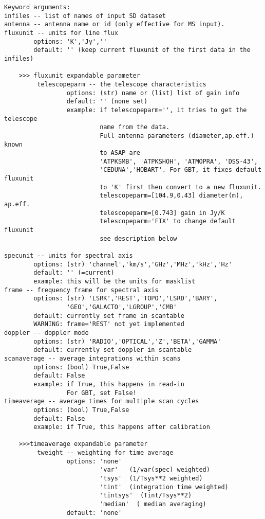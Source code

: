 \begin{verbatim}
Keyword arguments:
infiles -- list of names of input SD dataset
antenna -- antenna name or id (only effective for MS input). 
fluxunit -- units for line flux
        options: 'K','Jy',''
        default: '' (keep current fluxunit of the first data in the infiles)

    >>> fluxunit expandable parameter
         telescopeparm -- the telescope characteristics
                 options: (str) name or (list) list of gain info
                 default: '' (none set)
                 example: if telescopeparm='', it tries to get the telescope
                          name from the data.
                          Full antenna parameters (diameter,ap.eff.) known
                          to ASAP are
                          'ATPKSMB', 'ATPKSHOH', 'ATMOPRA', 'DSS-43',
                          'CEDUNA','HOBART'. For GBT, it fixes default fluxunit
                          to 'K' first then convert to a new fluxunit.
                          telescopeparm=[104.9,0.43] diameter(m), ap.eff.
                          telescopeparm=[0.743] gain in Jy/K
                          telescopeparm='FIX' to change default fluxunit
                          see description below

specunit -- units for spectral axis
        options: (str) 'channel','km/s','GHz','MHz','kHz','Hz'
        default: '' (=current)
        example: this will be the units for masklist
frame -- frequency frame for spectral axis
        options: (str) 'LSRK','REST','TOPO','LSRD','BARY',
                 'GEO','GALACTO','LGROUP','CMB'
        default: currently set frame in scantable
        WARNING: frame='REST' not yet implemented
doppler -- doppler mode
        options: (str) 'RADIO','OPTICAL','Z','BETA','GAMMA'
        default: currently set doppler in scantable
scanaverage -- average integrations within scans
        options: (bool) True,False
        default: False
        example: if True, this happens in read-in
                 For GBT, set False!
timeaverage -- average times for multiple scan cycles
        options: (bool) True,False
        default: False
        example: if True, this happens after calibration

    >>>timeaverage expandable parameter
         tweight -- weighting for time average
                 options: 'none' 
                          'var'   (1/var(spec) weighted)
                          'tsys'  (1/Tsys**2 weighted)
                          'tint'  (integration time weighted)
                          'tintsys'  (Tint/Tsys**2)
                          'median'  ( median averaging)
                 default: 'none'


\end{verbatim}
